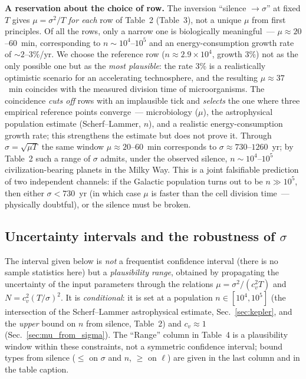 \documentclass[11pt,a4paper]{article}
\begin{document}
\textbf{A reservation about the choice of row.} The inversion ``silence $\to \sigma$'' at fixed $T$ gives $\mu=\sigma^2/T$ \emph{for each} row of Table~2 (Table~3), not a unique $\mu$ from first principles. Of all the rows, only a narrow one is biologically meaningful~--- $\mu \approx 20$--$60$~min, corresponding to $n \sim 10^4$--$10^5$ and an energy-consumption growth rate of $\sim 2$--$3\%$/yr. We choose the reference row ($n \approx 2.9\times10^4$, growth $3\%$) not as the only possible one but as the \emph{most plausible}: the rate $3\%$ is a realistically optimistic scenario for an accelerating technosphere, and the resulting $\mu \approx 37$~min coincides with the measured division time of microorganisms. The coincidence \emph{cuts off} rows with an implausible tick and \emph{selects} the one where three empirical reference points converge~--- microbiology ($\mu$), the astrophysical population estimate (Scherf--Lammer, $n$), and a realistic energy-consumption growth rate; this strengthens the estimate but does not prove it. Through $\sigma = \sqrt{\mu T}$ the same window $\mu \approx 20$--$60$~min corresponds to $\sigma \approx 730$--$1260$~yr; by Table~2 such a range of $\sigma$ admits, under the observed silence, $n \sim 10^4$--$10^5$ civilization-bearing planets in the Milky Way. This is a joint falsifiable prediction of two independent channels: if the Galactic population turns out to be $n \gg 10^5$, then either $\sigma < 730$~yr (in which case $\mu$ is faster than the cell division time~--- physically doubtful), or the silence must be broken.

\subsection{Uncertainty intervals and the robustness of \texorpdfstring{$\sigma$}{σ}}
\label{sec:intervals}

The interval given below is \emph{not} a frequentist confidence interval (there is no sample statistics here) but a \emph{plausibility range}, obtained by propagating the uncertainty of the input parameters through the relations $\mu=\sigma^2/(c_v^2T)$ and $N=c_v^2(T/\sigma)^2$. It is \emph{conditional}: it is set at a population $n\in[10^4,10^5]$ (the intersection of the Scherf--Lammer astrophysical estimate, Sec.~\ref{sec:kepler}, and the \emph{upper} bound on $n$ from silence, Table~2) and $c_v\approx1$ (Sec.~\ref{sec:mu_from_sigma}). The ``Range'' column in Table~4 is a plausibility window within these constraints, not a symmetric confidence interval; bound types from silence ($\le$ on $\sigma$ and $n$, $\ge$ on $\ell$) are given in the last column and in the table caption.
\end{document}
